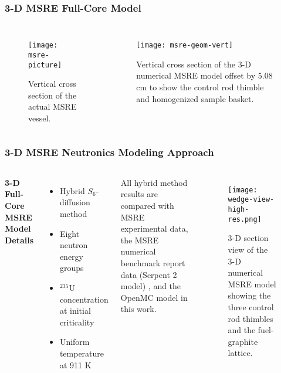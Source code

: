 \begin{frame}
  \frametitle{3-D MSRE Full-Core Model}
  \begin{columns}
    \column{5.5cm}
  \begin{figure}[p]
    \centering
    \texttt{[image: msre-picture]}
    \caption{Vertical cross section of the actual \gls{MSRE} vessel.}
    \label{fig:msre-picture}
  \end{figure}
    \column{6cm}
  \begin{figure}[p]
    \centering
    \texttt{[image: msre-geom-vert]}
    \caption{Vertical cross section of the 3-D numerical \gls{MSRE} model offset by 5.08 cm to show
    the control rod thimble and homogenized sample basket.}
    \label{fig:msre-geom-vert}
  \end{figure}
\end{columns}
\end{frame}

\begin{frame}
  \frametitle{3-D MSRE Neutronics Modeling Approach}
  \begin{columns}
    \column{5.5cm}
    \textbf{3-D Full-Core MSRE Model Details}
    \begin{itemize}
      \item Hybrid $S_6$-diffusion method
      \item Eight neutron energy groups
      \item $^{235}$U concentration at initial criticality
      \item Uniform temperature at 911 K
    \end{itemize}
    \vspace{.2cm}

    All hybrid method results are compared with MSRE experimental data, the MSRE numerical benchmark
    report data (Serpent 2 model) \cite{fratoni_molten_2020}, and the OpenMC model in this work.
    \column{5.5cm}
    \begin{figure}[p]
      \centering
      \texttt{[image: wedge-view-high-res.png]}
      \caption{3-D section view of the 3-D numerical \gls{MSRE} model showing
      the three control rod thimbles and the fuel-graphite lattice.}
      \label{fig:msre-geom-vert}
    \end{figure}
  \end{columns}
\end{frame}

